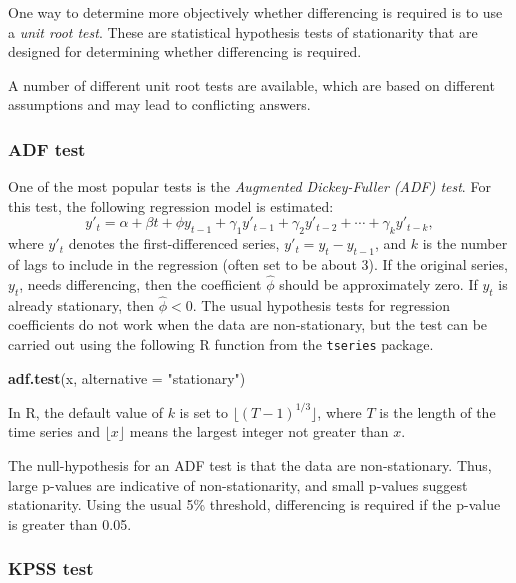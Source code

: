\documentclass[]{book}
\newenvironment{Shaded}{\begin{snugshade}}{\end{snugshade}}
\newcommand{\DataTypeTok}[1]{\textcolor[rgb]{0.13,0.29,0.53}{#1}}
\newcommand{\KeywordTok}[1]{\textcolor[rgb]{0.13,0.29,0.53}{\textbf{#1}}}
\newcommand{\NormalTok}[1]{#1}
\newcommand{\StringTok}[1]{\textcolor[rgb]{0.31,0.60,0.02}{#1}}
\begin{document}
One way to determine more objectively whether differencing is required is to use a \emph{unit root test}. These are statistical hypothesis tests of stationarity that are designed for determining whether differencing is required.

A number of different unit root tests are available, which are based on different assumptions and may lead to conflicting answers.

\hypertarget{adf-test}{%
\subsubsection*{ADF test}\label{adf-test}}

One of the most popular tests is the \emph{Augmented Dickey-Fuller (ADF) test}. For this test, the following regression model is estimated:
\[
  y'_t = \alpha + \beta t + \phi y_{t-1} + \gamma_1 y'_{t-1} + \gamma_2 y'_{t-2} + \cdots + \gamma_k y'_{t-k},
\]
where \(y'_t\) denotes the first-differenced series, \(y'_t=y_t-y_{t-1}\), and \(k\) is the number of lags to include in the regression (often set to be about 3). If the original series, \(y_t\), needs differencing, then the coefficient \(\hat\phi\) should be approximately zero. If \(y_t\) is already stationary, then \(\hat{\phi}<0\). The usual hypothesis tests for regression coefficients do not work when the data are non-stationary, but the test can be carried out using the following R function from the \texttt{tseries} package.

\begin{Shaded}
\begin{Highlighting}[]
\KeywordTok{adf.test}\NormalTok{(x, }\DataTypeTok{alternative =} \StringTok{"stationary"}\NormalTok{)}
\end{Highlighting}
\end{Shaded}

In R, the default value of \(k\) is set to \(\lfloor(T - 1)^{1/3}\rfloor\), where \(T\) is the length of the time series and \(\lfloor x\rfloor\) means the largest integer not greater than \(x\).

The null-hypothesis for an ADF test is that the data are non-stationary. Thus, large p-values are indicative of non-stationarity, and small p-values suggest stationarity. Using the usual 5\% threshold, differencing is required if the p-value is greater than 0.05.

\hypertarget{kpss-test}{%
\subsubsection*{KPSS test}\label{kpss-test}}
\end{document}
